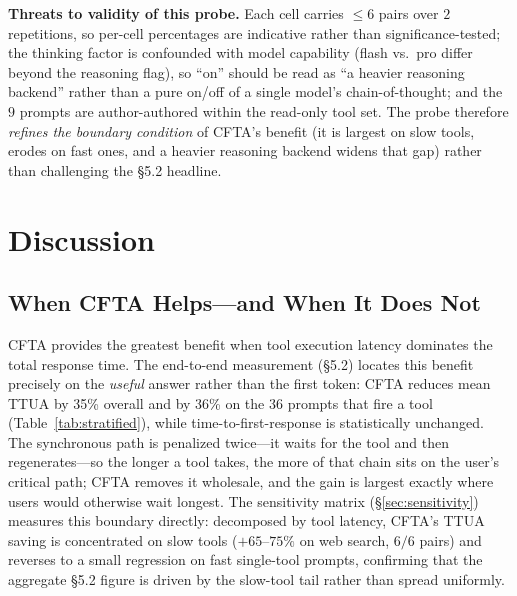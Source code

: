\documentclass[numbered,mediumone,traditional]{oup-authoring-template}
\begin{document}
\textbf{Threats to validity of this probe.} Each cell carries $\le 6$ pairs over $2$ repetitions, so per-cell percentages are indicative rather than significance-tested; the thinking factor is confounded with model capability (flash vs.\ pro differ beyond the reasoning flag), so ``on'' should be read as ``a heavier reasoning backend'' rather than a pure on/off of a single model's chain-of-thought; and the $9$ prompts are author-authored within the read-only tool set. The probe therefore \emph{refines the boundary condition} of CFTA's benefit (it is largest on slow tools, erodes on fast ones, and a heavier reasoning backend widens that gap) rather than challenging the \S5.2 headline.

\section{Discussion}

\subsection{When CFTA Helps---and When It Does Not}

CFTA provides the greatest benefit when tool execution latency dominates the total response time. The end-to-end measurement (\S5.2) locates this benefit precisely on the \emph{useful} answer rather than the first token: CFTA reduces mean TTUA by 35\% overall and by 36\% on the $36$ prompts that fire a tool (Table~\ref{tab:stratified}), while time-to-first-response is statistically unchanged. The synchronous path is penalized twice---it waits for the tool and then regenerates---so the longer a tool takes, the more of that chain sits on the user's critical path; CFTA removes it wholesale, and the gain is largest exactly where users would otherwise wait longest. The sensitivity matrix (\S\ref{sec:sensitivity}) measures this boundary directly: decomposed by tool latency, CFTA's TTUA saving is concentrated on slow tools ($+65$--$75\%$ on web search, $6/6$ pairs) and reverses to a small regression on fast single-tool prompts, confirming that the aggregate \S5.2 figure is driven by the slow-tool tail rather than spread uniformly.
\end{document}
